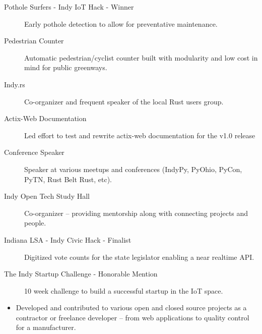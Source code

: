\documentclass[letterpaper]{article}        %
\begin{document}

  \begin{description}
    
            \item[Pothole Surfers - Indy IoT Hack - Winner] Early pothole detection to allow for preventative maintenance.
        
    
            \item[Pedestrian Counter] Automatic pedestrian/cyclist counter built with modularity and low cost in mind for public greenways.
        
    
            \item[Indy.rs] Co-organizer and frequent speaker of the local Rust users group.
        
    
            \item[Actix-Web Documentation] Led effort to test and rewrite actix-web documentation for the v1.0 release
        
    
            \item[Conference Speaker] Speaker at various meetups and conferences (IndyPy, PyOhio, PyCon, PyTN, Rust Belt Rust, etc).
        
    
            \item[Indy Open Tech Study Hall] Co-organizer -- providing mentorship along with connecting projects and people.
        
    
            \item[Indiana LSA - Indy Civic Hack - Finalist] Digitized vote counts for the state legislator enabling a near realtime API.
        
    
            \item[The Indy Startup Challenge - Honorable Mention] 10 week challenge to build a successful startup in the IoT space.
        
    
  \end{description}


  
    \begin{itemize}
    \item Developed and contributed to various open and closed source projects as a contractor or freelance developer -- from web applications to quality control for a manufacturer.
    \end{itemize}
  
\end{document}
